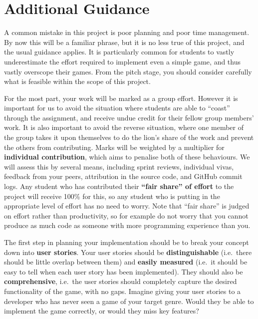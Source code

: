 \documentclass{../fal_assignment}
\begin{document}
\section*{Additional Guidance}

A common mistake in this project is poor planning and poor time management.
By now this will be a familiar phrase,
but it is no less true of this project, and the usual guidance applies.
It is particularly common for students to
vastly underestimate the effort required to implement even a simple game,
and thus vastly overscope their games.
From the pitch stage, you should consider carefully what is feasible within the scope of this project.

For the most part, your work will be marked as a group effort.
However it is important for us to avoid the situation where students are able to ``coast'' through the assignment,
and receive undue credit for their fellow group members' work.
It is also important to avoid the reverse situation, where one member of the group takes it upon themselves
to do the lion's share of the work and prevent the others from contributing.
Marks will be weighted by a multiplier for \textbf{individual contribution},
which aims to penalise both of these behaviours.
We will assess this by several means, including sprint reviews, individual vivas, feedback from your peers,
attribution in the source code, and GitHub commit logs.
Any student who has contributed their \textbf{``fair share'' of effort} to the project will receive 100\% for this,
so any student who is putting in the appropriate level of effort has no need to worry.
Note that ``fair share'' is judged on effort rather than productivity,
so for example do not worry that you cannot produce as much code as someone with more programming experience than you.

The first step in planning your implementation should be to break your concept down into \textbf{user stories}. 
Your user stories should be \textbf{distinguishable} (i.e.\ there should be little overlap between them)
and \textbf{easily measured} (i.e.\ it should be easy to tell when each user story has been implemented).
They should also be \textbf{comprehensive}, i.e.\ the user stories should completely capture the
desired functionality of the game, with no gaps.
Imagine giving your user stories to a developer who has never seen a game of your target genre.
Would they be able to implement the game correctly, or would they miss key features?

\end{document}
